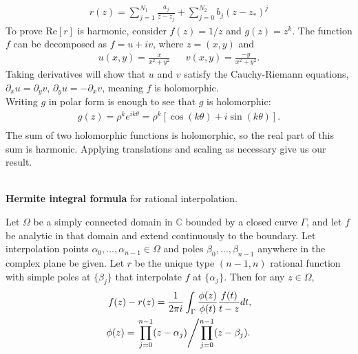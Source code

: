 \documentclass{seminar}
\begin{document}
\begin{slide} %
{} \small \\
\begin{align*}
r(z)= \sum_{j=1}^{N_1} \frac{a_j}{z-z_j} + \sum_{j=0}^{N_2} b_j (z-z_*)^j
\end{align*}
To prove $\mathrm{Re}[r]$ is harmonic, consider $f(z)=1/z$ and $g(z)=z^k$.
The function $f$ can be decomposed as $f=u+iv$, where $z=(x,y)$ and
\begin{align*}
u(x,y)=\frac{x}{x^2+y^2} &&
v(x,y)=\frac{-y}{x^2+y^2}.
\end{align*}
Taking derivatives will show that $u$ and $v$ satisfy the Cauchy-Riemann equations, ${\partial}_x u={\partial}_y v$, ${\partial}_y u=-{\partial}_x v$, meaning $f$ is holomorphic.\\

Writing $g$ in polar form is enough to see that $g$ is holomorphic:
\begin{align*}
g(z)=\rho^k e^{i k \theta} = \rho^k [\cos{(k\theta)} + i \sin{(k\theta)}] . \\
\end{align*}
The sum of two holomorphic functions is holomorphic, so the real part of this sum is harmonic. Applying translations and scaling as necessary give us our result.
\end{slide} %




\begin{slide} %
{} \small \\

\textbf{Hermite integral formula} for rational interpolation.

Let $\Omega$ be a simply connected domain in $\mathds{C}$ bounded by a closed curve $\Gamma$, and let $f$ be analytic in that domain and extend continuously to the boundary. Let interpolation points ${\alpha}_0, \ldots ,{\alpha}_{n-1} \in \Omega$ and poles ${\beta}_0, \ldots ,{\beta}_{n-1}$ anywhere in the complex plane be given. Let $r$ be the unique type $(n-1,n)$ rational function with simple poles at $\{{\beta}_j\}$ that interpolate $f$ at $\{{\alpha}_j\}$. Then for any $z \in \Omega$,
\begin{align*}
f(z)-r(z)=\frac{1}{2 \pi i} \int_{\Gamma} \frac{\phi (z)}{\phi (t)} \frac{f(t)}{t-z}dt, \\
\phi (z) = \left. \prod_{j=0}^{n-1}(z-{\alpha}_j) \middle/ \prod_{j=0}^{n-1}(z-{\beta}_j). \right.
\end{align*}
\end{slide} %
\end{document}
